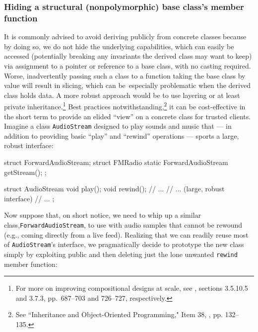 \subsubsection[Hiding a structural (nonpolymorphic) base class's member function]{Hiding a structural (nonpolymorphic) base class’s member function}\label{hiding-a-structural-(nonpolymorphic)-base-class's-member-function}

It is commonly advised to avoid deriving publicly from concrete classes because by doing so, we do not hide the underlying capabilities, which can easily be accessed (potentially breaking any invariants the derived class may want to keep) via assignment to a pointer or reference to a base class, with no casting required.  Worse, inadvertently passing such a class to a function taking the base class by value will result in slicing, which can be~especially problematic when the derived class holds data. A more robust approach would be to use layering or at least private inheritance.\footnote{For more on improving compositional designs at scale, see
  \cite{lakos20}, sections 3.5.10.5 and 3.7.3, pp.~687--703 and
  726--727, respectively.} Best practices notwithstanding,\footnote{See ``Inheritance and Object-Oriented Programming," Item 38, \cite{meyers92}, pp. 132--135.} it can be cost-effective in the short
term to provide an elided ``view'' on a concrete class for trusted
clients. Imagine a class \lstinline!AudioStream! designed to play sounds
and music that --- in addition to providing basic ``play'' and
``rewind'' operations --- sports a large, robust interface:
\newpage%

\begin{emcppshiddenlisting}[emcppsbatch=e2]
struct ForwardAudioStream;
struct FMRadio {
    static ForwardAudioStream getStream();
};
\end{emcppshiddenlisting}
\begin{emcppslisting}[emcppsbatch=e2]
struct AudioStream
{
    void play();
    void rewind();
    // ...
    // ... (large, robust interface)
    // ...
};
\end{emcppslisting}


Now suppose that, on short notice, we need to whip up a similar
class,\linebreak[4] \lstinline!ForwardAudioStream!, to use with audio samples that
cannot be rewound (e.g., coming directly from a live feed). Realizing
that we can readily reuse most of \lstinline!AudioStream!'s interface, we
pragmatically decide to prototype the new class simply by exploiting
public  and then deleting just the lone
unwanted \lstinline!rewind! member function:

